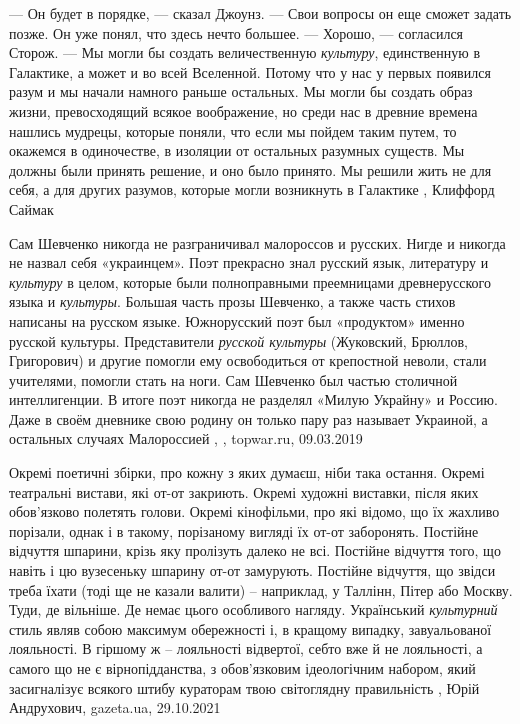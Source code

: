 — Он будет в порядке, — сказал Джоунз. — Свои вопросы он еще сможет задать
позже. Он уже понял, что здесь нечто большее.  — Хорошо, — согласился Сторож. —
Мы могли бы создать величественную \emph{культуру}, единственную в Галактике, а может
и во всей Вселенной. Потому что у нас у первых появился разум и мы начали
намного раньше остальных. Мы могли бы создать образ жизни, превосходящий всякое
воображение, но среди нас в древние времена нашлись мудрецы, которые поняли,
что если мы пойдем таким путем, то окажемся в одиночестве, в изоляции от
остальных разумных существ. Мы должны были принять решение, и оно было принято.
Мы решили жить не для себя, а для других разумов, которые могли возникнуть в
Галактике
, Клиффорд Саймак

Сам Шевченко никогда не разграничивал малороссов и русских. Нигде и никогда не
назвал себя «украинцем». Поэт прекрасно знал русский язык, литературу и
\emph{культуру} в целом, которые были полноправными преемницами древнерусского языка и
\emph{культуры}. Большая часть прозы Шевченко, а также часть стихов написаны на
русском языке. Южнорусский поэт был «продуктом» именно русской культуры.
Представители \emph{русской культуры} (Жуковский, Брюллов, Григорович) и другие
помогли ему освободиться от крепостной неволи, стали учителями, помогли стать
на ноги. Сам Шевченко был частью столичной интеллигенции. В итоге поэт никогда
не разделял «Милую Украйну» и Россию. Даже в своём дневнике свою родину он
только пару раз называет Украиной, а остальных случаях Малороссией
, , topwar.ru, 09.03.2019

Окремі поетичні збірки, про кожну з яких думаєш, ніби така остання.  Окремі
театральні вистави, які от-от закриють.  Окремі художні виставки, після яких
обов'язково полетять голови.  Окремі кінофільми, про які відомо, що їх жахливо
порізали, однак і в такому, порізаному вигляді їх от-от заборонять.  Постійне
відчуття шпарини, крізь яку пролізуть далеко не всі.  Постійне відчуття того,
що навіть і цю вузесеньку шпарину от-от замурують.  Постійне відчуття, що
звідси треба їхати (тоді ще не казали валити) – наприклад, у Таллінн, Пітер або
Москву. Туди, де вільніше. Де немає цього особливого нагляду.  Український
\emph{культурний} стиль являв собою максимум обережності і, в кращому випадку,
завуальованої лояльності. В гіршому ж – лояльності відвертої, себто вже й не
лояльності, а самого що не є вірнопідданства, з обов'язковим ідеологічним
набором, який засигналізує всякого штибу кураторам твою світоглядну
правильність
, 
Юрій Андрухович, gazeta.ua, 29.10.2021

